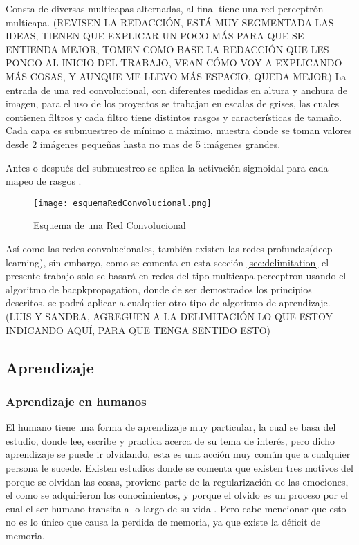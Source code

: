             Consta de diversas multicapas alternadas, al final tiene una red perceptr\'on multicapa. (REVISEN LA REDACCIÓN, ESTÁ MUY SEGMENTADA LAS IDEAS, TIENEN QUE EXPLICAR UN POCO MÁS PARA QUE SE ENTIENDA MEJOR, TOMEN COMO BASE LA REDACCIÓN QUE LES PONGO AL INICIO DEL TRABAJO, VEAN CÓMO VOY A EXPLICANDO MÁS COSAS, Y AUNQUE ME LLEVO MÁS ESPACIO, QUEDA MEJOR)
            La entrada de una red convolucional, con diferentes medidas en altura y anchura de imagen, para el uso 
            de los proyectos se trabajan en escalas de grises, las cuales contienen filtros y cada filtro tiene distintos 
            rasgos y características de tamaño. Cada capa es submuestreo de m\'inimo a m\'aximo, muestra donde se toman valores 
            desde 2 im\'agenes pequeñas hasta no mas de 5 im\'agenes grandes.

            Antes o despu\'es del submuestreo se aplica la activaci\'on sigmoidal para cada mapeo de rasgos \cite{duran2017}.

            \begin{figure}[H]
                \centering
                \texttt{[image: esquemaRedConvolucional.png]}
                \caption{Esquema de una Red Convolucional \cite{duran2017}}
                \label{fig:fig7}
            \end{figure}

Así como las redes convolucionales, también existen las redes profundas(deep learning), sin embargo, como se comenta en esta sección \ref{sec:delimitation} el presente trabajo solo se basará en redes del tipo multicapa perceptron usando el algoritmo de bacpkpropagation, donde de ser demostrados los principios descritos, se podrá aplicar a cualquier otro tipo de algoritmo de aprendizaje.  (LUIS Y SANDRA, AGREGUEN A LA DELIMITACIÓN LO QUE ESTOY INDICANDO AQUÍ, PARA QUE TENGA SENTIDO ESTO)



\subsection{Aprendizaje}

\subsubsection{Aprendizaje en humanos}
        El humano tiene una forma de aprendizaje muy particular, la cual se basa del estudio, donde lee, escribe y practica acerca de
        su tema de interés, pero dicho aprendizaje se puede ir olvidando, esta es una acción muy común que a cualquier persona le sucede.
        Existen estudios donde se comenta que existen tres motivos del porque se olvidan las cosas, proviene parte de la regularización de las emociones,
        el como se adquirieron los conocimientos, y porque el olvido es un proceso por el cual el ser humano transita a lo largo de su vida \cite{Nrby2015}. Pero cabe
        mencionar que esto no es lo único que causa la perdida de memoria, ya que existe la déficit de memoria. 

